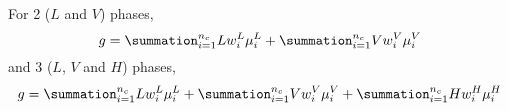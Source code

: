 \documentclass[12pt,a4paper,oneside]{report}%
\begin{document}
For 2 ($L$ and $V$) phases,
\begin{displaymath}
g = \summation_{i=1}^{n_{c}}Lw_{i}^{L}\mu_{i}^{L} + \summation_{i=1}^{n_{c}}Vw_{i}^{V}\mu_{i}^{V}
\end{displaymath}
and 3 ($L$, $V$ and $H$) phases,
\begin{displaymath}
g = \summation_{i=1}^{n_{c}}Lw_{i}^{L}\mu_{i}^{L} + \summation_{i=1}^{n_{c}}Vw_{i}^{V}\mu_{i}^{V} + \summation_{i=1}^{n_{c}}Hw_{i}^{H}\mu_{i}^{H}
\end{displaymath}



\end{document}
